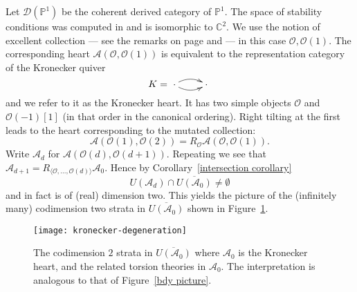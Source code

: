\documentclass{article}
\theoremstyle{plain}
\theoremstyle{definition}
\theoremstyle{remark}
\newcommand{\C}{\mathbb{C}}
\renewcommand{\P}{\mathbb{P}}
\newcommand{\cat}[1]{\mathcal{#1}}
\begin{document}
Let $\cat{D}(\P^1)$ be the coherent derived category of $\P^1$. The space of stability conditions was computed in  \cite{MR2219846} and is isomorphic to $\C^2$. We use the notion of excellent collection --- see the remarks on page \pageref{excellent remarks} and  \cite[\S3]{MR2142382} --- in this case $\mathcal{O}, \mathcal{O}(1)$. The corresponding heart  $\cat{A}(\mathcal{O}, \mathcal{O}(1))$ is equivalent to the representation category of the Kronecker quiver
\begin{equation}
\label{kronecker}
K= \xymatrix{\cdot \ar@/{}_{.5pc}/[r] \ar@/{}^{.5pc}/[r] & \cdot }
\end{equation}
and we refer to it as the Kronecker heart. It has two simple objects $\mathcal{O}$ and $\mathcal{O}(-1)[1]$ (in that order in the canonical ordering). Right tilting at the first leads to the heart corresponding to the mutated collection:
$$
\cat{A}(\mathcal{O}(1),\mathcal{O}(2)) = R_{\mathcal{O}} \cat{A}(\mathcal{O}, \mathcal{O}(1)).
$$
Write $\cat{A}_d$ for $\cat{A}(\mathcal{O}(d),\mathcal{O}(d+1))$. Repeating we see that
$\cat{A}_{d+1} = R_{\langle \mathcal{O}, \ldots,\mathcal{O}(d)\rangle} \cat{A}_0$. Hence by Corollary~\ref{intersection corollary}
$$
U(\cat{A}_d ) \cap \overline{U(\cat{A}_0)} \neq \emptyset
$$
and in fact is of (real) dimension two. This yields the picture of the (infinitely many) codimension two strata in $\overline{U(\cat{A}_0)}$ shown in Figure~\ref{kronecker bdy}. 
 
\begin{figure}[htbp]
\begin{center}
\texttt{[image: kronecker-degeneration]}
\caption{The codimension $2$ strata in $\overline{U(\cat{A}_0 )}$ where $\cat{A}_0$ is the Kronecker heart, and the related torsion theories in $\cat{A}_0$. The interpretation is analogous to that of Figure~\ref{bdy picture}.}  
\label{kronecker bdy}
\end{center}
\end{figure} 
\end{document}
